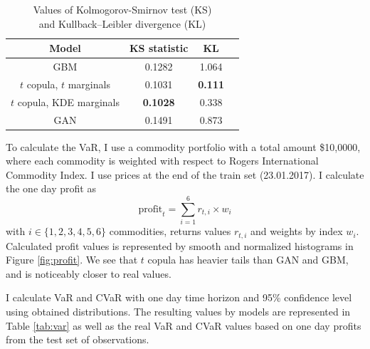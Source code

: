 \documentclass{article}
\begin{document}
\begin{table}[h]
    \begin{center}
    \begin{tabular}{ |c|c|c|c| } 
    \hline
    Model & KS statistic & KL \\ 
    \hline
    GBM & 0.1282 & 1.064 \\ 
    $t$ copula, $t$ marginals & 0.1031 & \textbf{0.111} \\ 
    $t$ copula, KDE marginals & \textbf{0.1028} & 0.338 \\ 
    GAN & 0.1491 & 0.873 \\ 
    \hline
    \end{tabular}
    \end{center}
    \caption{Values of Kolmogorov-Smirnov test (KS) \\and Kullback–Leibler divergence (KL)}
    \label{tab:quality}
\end{table}

To calculate the VaR, I use a commodity portfolio with a total amount \$10,0000, where each commodity is weighted with respect to Rogers International Commodity Index. I use prices at the end of the train set (23.01.2017). I calculate the one day profit as
$$\text{profit}_t = \sum_{i=1}^6 r_{t,i} \times w_i$$
with $i \in \{1, 2, 3, 4, 5 , 6\}$ commodities, returns values $r_{t, i}$ and weights by index $w_i$. Calculated profit values is represented by smooth and normalized histograms in Figure \ref{fig:profit}. We see that $t$ copula has heavier tails than GAN and GBM, and is noticeably closer to real values.

I calculate VaR and CVaR with one day time horizon and 95\% confidence level using obtained distributions. The resulting values by models are represented in Table \ref{tab:var} as well as the real VaR and CVaR values based on one day profits from the test set of observations.
\end{document}

